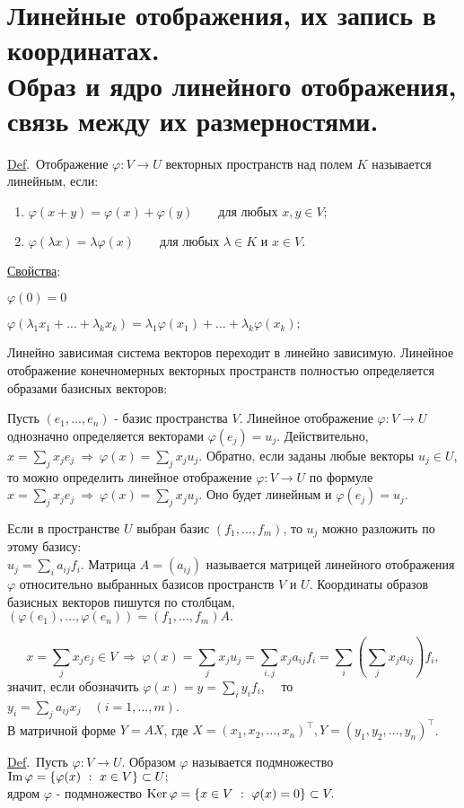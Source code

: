 \documentclass[draft]{article}%
\newcommand{\de}{\par\noindent\underline{Def}.\ }%
\newcommand{\ab}{\par\noindent}%
\renewcommand{\phi}{\varphi}
\newcommand{\baz}[1]{\left(#1_1,\dots,#1_n\right)}%
\newcommand{\nn}[1]{#1_1,#1_2,\dots,#1_n}%
\begin{document}
\section{Линейные отображения, их запись в координатах.\\ Образ и ядро линейного отображения,\\ связь между их размерностями.}
\label{q6} %
\de Отображение $\phi :V\rightarrow U$ векторных пространств над полем $K$ называется линейным, если:
\begin{enumerate}
    \item $\phi(x+y)=\phi(x)+\phi(y)\qquad\mbox{для любых }x,y\in V;$
    \item $\phi(\lambda x)=\lambda\phi(x)\qquad\mbox{для любых }\lambda\in K\mbox{ и }x\in V.$
\end{enumerate}
\ab \underline{Свойства}: %
\ab $\phi(0)=0$ %
\ab $\phi\left(\lambda_1x_1+\dots+\lambda_kx_k\right)=\lambda_1\phi(x_1)+\dots+\lambda_k\phi(x_k);$ %
\ab Линейно зависимая система векторов переходит в линейно зависимую. %
Линейное отображение конечномерных векторных пространств полностью определяется образами базисных векторов: %
\ab Пусть $\baz{e}$ - базис пространства $V$. Линейное отображение $\phi :V\rightarrow U$ однозначно
определяется векторами $\phi(e_j)=u_j.$ Действительно, $x=\sum\limits_jx_je_j\ \Rightarrow\
\phi(x)=\sum\limits_jx_ju_j.$ Обратно, если заданы любые векторы $u_j\in U$, то можно определить линейное
отображение $\phi :V\rightarrow U$ по формуле $x=\sum\limits_jx_je_j\ \Rightarrow\ \phi(x)=\sum\limits_jx_ju_j.$
Оно будет линейным и $\phi(e_j)=u_j.$%
\ab Если в пространстве $U$ выбран базис $(f_1,\dots,f_m)$, то $u_j$ можно разложить по этому базису:\\%
$u_j=\sum\limits_ia_{ij}f_i$. Матрица $A=\left(a_{ij}\right)$ называется матрицей линейного отображения $\phi$
относительно выбранных базисов пространств $V$ и $U$. Координаты образов базисных векторов пишутся по столбцам,
$(\phi(e_1),\dots,\phi(e_n))=(f_1,\dots,f_m)A.$ %
\ab $$x=\sum\limits_jx_je_j\in V\ \Rightarrow\ \phi(x)=\sum\limits_jx_ju_j=\sum\limits_{i,j}x_ja_{ij}f_i=%
\sum\limits_i\left(\sum\limits_jx_ja_{ij}\right)f_i,$$ значит, если обозначить $\phi(x)=y=\sum\limits_iy_if_i$, \
\ то\ \  $y_i=\sum\limits_ja_{ij}x_j\quad(i=1,\dots,m)$. \\ В матричной форме $Y=AX$, где $X=(\nn{x})^\top,
Y=(\nn{y})^\top$. %
\de Пусть $\phi :V\rightarrow U$. Образом $\phi$ называется подмножество ${\rm Im\,}\phi=\left\{\phi(x)\ :\ x\in V
\right\}\subset U;$\\ ядром $\phi$ - подмножество ${\rm Ker\,}\phi=\left\{x\in V\ :\ \phi(x)=0\right\}\subset V.$
\end{document}
